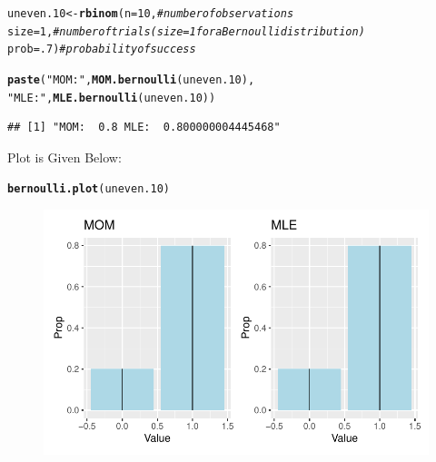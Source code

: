 \documentclass{article}\usepackage[]{graphicx}\usepackage[]{color}
\makeatletter
\def\maxwidth{ %
  \ifdim\Gin@nat@width>\linewidth
    \linewidth
  \else
    \Gin@nat@width
  \fi
}
\newcommand{\hlnum}[1]{\textcolor[rgb]{0.686,0.059,0.569}{#1}}%
\newcommand{\hlstr}[1]{\textcolor[rgb]{0.192,0.494,0.8}{#1}}%
\newcommand{\hlcom}[1]{\textcolor[rgb]{0.678,0.584,0.686}{\textit{#1}}}%
\newcommand{\hlstd}[1]{\textcolor[rgb]{0.345,0.345,0.345}{#1}}%
\newcommand{\hlkwb}[1]{\textcolor[rgb]{0.69,0.353,0.396}{#1}}%
\newcommand{\hlkwc}[1]{\textcolor[rgb]{0.333,0.667,0.333}{#1}}%
\newcommand{\hlkwd}[1]{\textcolor[rgb]{0.737,0.353,0.396}{\textbf{#1}}}%
\newenvironment{kframe}{%
 \def\at@end@of@kframe{}%
 \ifinner\ifhmode%
  \def\at@end@of@kframe{\end{minipage}}%
  \begin{minipage}{\columnwidth}%
 \fi\fi%
 \def\FrameCommand##1{\hskip\@totalleftmargin \hskip-\fboxsep
 \colorbox{shadecolor}{##1}\hskip-\fboxsep
     \hskip-\linewidth \hskip-\@totalleftmargin \hskip\columnwidth}%
 \MakeFramed {\advance\hsize-\width
   \@totalleftmargin\z@ \linewidth\hsize
   \@setminipage}}%
 {\par\unskip\endMakeFramed%
 \at@end@of@kframe}
\newenvironment{knitrout}{}{} %
\makeatother
\begin{document}
\begin{enumerate}
\begin{enumerate}
\begin{knitrout}
\color{fgcolor}\begin{kframe}
\begin{alltt}
\hlstd{uneven.10} \hlkwb{<-} \hlkwd{rbinom}\hlstd{(}\hlkwc{n}\hlstd{=}\hlnum{10}\hlstd{,}        \hlcom{#number of observations}
                    \hlkwc{size}\hlstd{=}\hlnum{1}\hlstd{,}        \hlcom{#number of trials (size=1 for a Bernoulli distribution)}
                    \hlkwc{prob}\hlstd{=}\hlnum{.7}\hlstd{)}       \hlcom{#probability of success}

\hlkwd{paste}\hlstd{(}\hlstr{"MOM: "}\hlstd{,} \hlkwd{MOM.bernoulli}\hlstd{(uneven.10),}
      \hlstr{"MLE: "}\hlstd{,} \hlkwd{MLE.bernoulli}\hlstd{(uneven.10))}
\end{alltt}
\begin{verbatim}
## [1] "MOM:  0.8 MLE:  0.800000004445468"
\end{verbatim}
\end{kframe}
\end{knitrout}
Plot is Given Below:
\begin{knitrout}
\color{fgcolor}\begin{kframe}
\begin{alltt}
\hlkwd{bernoulli.plot}\hlstd{(uneven.10)}
\end{alltt}
\end{kframe}
\end{knitrout}
\begin{figure}[H]
  \begin{center}
\begin{knitrout}
\color{fgcolor}
\includegraphics[width=\maxwidth]{figure/unnamed-chunk-6-1} 

\end{knitrout}
\end{center}
\end{figure}
\end{enumerate}
\end{enumerate}
\end{document}
